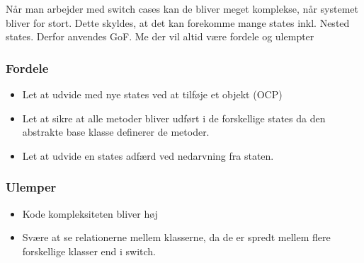 \documentclass[../report.tex]{subfiles}
\begin{document}
Når man arbejder med switch cases kan de bliver meget komplekse, når systemet bliver for stort. Dette skyldes, at det kan forekomme mange states inkl. Nested states. Derfor anvendes GoF. Me der vil altid være fordele og ulempter

\subsubsection*{Fordele}
\begin{itemize}
    \item Let at udvide med nye states ved at tilføje et objekt (OCP)
    \item Let at sikre at alle metoder bliver udført i de forskellige states da den abstrakte base klasse definerer de metoder.
    \item Let at udvide en states adfærd ved nedarvning fra staten.
\end{itemize}

\subsubsection{Ulemper}
\begin{itemize}
    \item Kode kompleksiteten bliver høj
    \item Svære at se relationerne mellem klasserne, da de er spredt mellem flere forskellige klasser end i switch.
\end{itemize}
\end{document}

